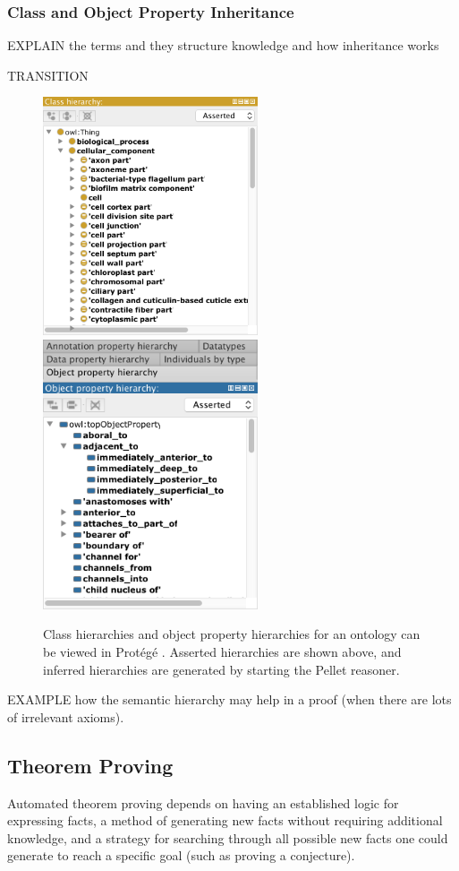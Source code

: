 \documentclass{article}
\begin{document}
\subsubsection{Class and Object Property Inheritance}

 EXPLAIN the terms and they structure knowledge and how inheritance works
 
 

TRANSITION

\begin{figure}[h]
\centering
\includegraphics[width=2.5in]{class-hierarchy}
\includegraphics[width=2.5in]{object-property-hierarchy}
\caption{Class hierarchies and object property hierarchies for an ontology can be viewed in Prot{\'e}g{\'e} \cite{gennari2003evolution}. Asserted hierarchies are shown above, and inferred hierarchies are generated by starting the Pellet reasoner.}
\label{fig:class-hierarchy}
\end{figure}

EXAMPLE how the semantic hierarchy may help in a proof (when there are lots of irrelevant axioms).

\subsection{{Theorem Proving}}
Automated theorem proving depends on having an established logic for expressing facts, a method of generating new facts without requiring additional knowledge, and a strategy for searching through all possible new facts one could generate to reach a specific goal (such as proving a conjecture).
\end{document}
